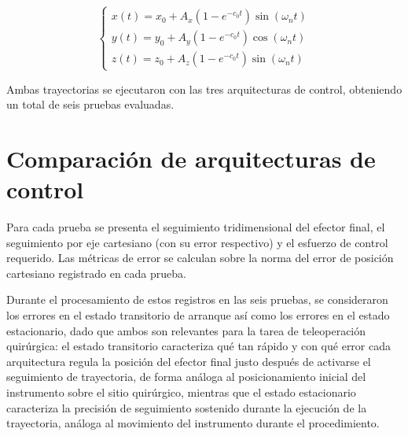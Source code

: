 \begin{equation}
    \begin{cases}
        x(t) = x_0 + A_x\left(1-e^{-c_0 t}\right)\sin(\omega_n t) \\
        y(t) = y_0 + A_y\left(1-e^{-c_0 t}\right)\cos(\omega_n t) \\
        z(t) = z_0 + A_z\left(1-e^{-c_0 t}\right)\sin(\omega_n t)
    \end{cases}
\end{equation}

Ambas trayectorias se ejecutaron con las tres arquitecturas de control,
obteniendo un total de seis pruebas evaluadas.

\section{Comparación de arquitecturas de control}

Para cada prueba se presenta el seguimiento tridimensional del efector final,
el seguimiento por eje cartesiano (con su error respectivo) y el esfuerzo de
control requerido. Las métricas de error se calculan sobre la norma del error
de posición cartesiano registrado en cada prueba.

Durante el procesamiento de estos registros en las seis pruebas, se
consideraron los errores en el estado transitorio de arranque así como los
errores en el estado estacionario, dado que ambos son relevantes para la
tarea de teleoperación quirúrgica: el estado transitorio caracteriza qué tan
rápido y con qué error cada arquitectura regula la posición del efector
final justo después de activarse el seguimiento de trayectoria, de forma
análoga al posicionamiento inicial del instrumento sobre el sitio
quirúrgico, mientras que el estado estacionario caracteriza la precisión de
seguimiento sostenido durante la ejecución de la trayectoria, análoga al
movimiento del instrumento durante el procedimiento.

